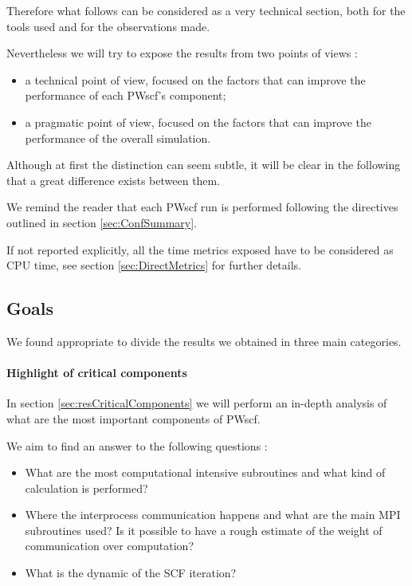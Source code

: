 \documentclass[a4paper,12pt]{article}
\begin{document}
Therefore what follows can be considered as a very technical section, both for the tools used and for the observations made.

Nevertheless we will try to expose the results from two points of views :
\begin{itemize}
	\item a technical point of view, focused on the factors that can improve the performance of each PWscf's component;
	\item a pragmatic point of view, focused on the factors that can improve the performance of the overall simulation.
\end{itemize}
Although at first the distinction can seem subtle, it will be clear in the following that a great difference exists between them.

We remind the reader that each PWscf run is performed following the directives outlined in section \ref{sec:ConfSummary}.

If not reported explicitly, all the time metrics exposed have to be considered as CPU time, see section \ref{sec:DirectMetrics} for further details.

\newpage

\subsection{Goals}\label{sec:Goals}
We found appropriate to divide the results we obtained in three main categories.

\paragraph{Highlight of critical components} 
In section \ref{sec:resCriticalComponents} we will perform an in-depth analysis of what are the most important components of PWscf.

We aim to find an answer to the following questions :
\begin{itemize}
	\item What are the most computational intensive subroutines and what kind of calculation is performed?
	\item Where the interprocess communication happens and what are the main MPI subroutines used? Is it possible to have a rough estimate of the weight of communication over computation?
	\item What is the dynamic of the SCF iteration? 	
\end{itemize}
\end{document}
